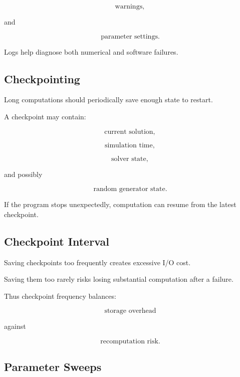 \[
\boxed{
\text{warnings},
}
\]

and

\[
\boxed{
\text{parameter settings}.
}
\]

Logs help diagnose both numerical and software failures.

\subsection{Checkpointing}
\label{subsec:checkpointing}

Long computations should periodically save enough state to restart.

A checkpoint may contain:

\[
\boxed{
\text{current solution},
}
\]

\[
\boxed{
\text{simulation time},
}
\]

\[
\boxed{
\text{solver state},
}
\]

and possibly

\[
\boxed{
\text{random generator state}.
}
\]

If the program stops unexpectedly, computation can resume from the latest
checkpoint.

\subsection{Checkpoint Interval}
\label{subsec:checkpoint-interval}

Saving checkpoints too frequently creates excessive I/O cost.

Saving them too rarely risks losing substantial computation after a
failure.

Thus checkpoint frequency balances:

\[
\boxed{
\text{storage overhead}
}
\]

against

\[
\boxed{
\text{recomputation risk}.
}
\]

\subsection{Parameter Sweeps}
\label{subsec:parameter-sweeps}

